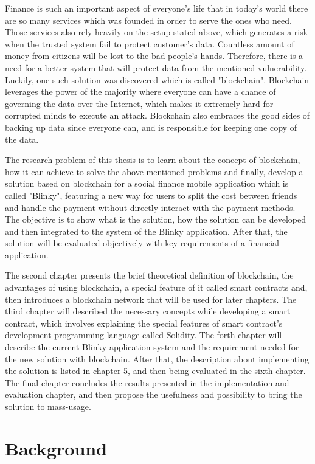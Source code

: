 \documentclass[twoside,draftfooter]{tutthesis} %
\begin{document}
Finance is such an important aspect of everyone's life that in today's world there are so many services which was founded in order to serve the ones who need. Those services also rely heavily on the setup stated above, which generates a risk when the trusted system fail to protect customer's data. Countless amount of money from citizens will be lost to the bad people's hands. Therefore, there is a need for a better system that will protect data from the mentioned vulnerability. Luckily, one such solution was discovered which is called "blockchain". Blockchain leverages the power of the majority where everyone can have a chance of governing the data over the Internet, which makes it extremely hard for corrupted minds to execute an attack. Blockchain also embraces the good sides of backing up data since everyone can, and is responsible for keeping one copy of the data.

The research problem of this thesis is to learn about the concept of blockchain, how it can achieve to solve the above mentioned problems and finally, develop a solution based on blockchain for a social finance mobile application which is called "Blinky", featuring a new way for users to split the cost between friends and handle the payment without directly interact with the payment methods. The objective is to show what is the solution, how the solution can be developed and then integrated to the system of the Blinky application. After that, the solution will be evaluated objectively with key requirements of a financial application.

The second chapter presents the brief theoretical definition of blockchain, the advantages of using blockchain, a special feature of it called smart contracts and, then introduces a blockchain network that will be used for later chapters. The third chapter will described the necessary concepts while developing a smart contract, which involves explaining the special features of smart contract's development programming language called Solidity. The forth chapter will describe the current Blinky application system and the requirement needed for the new solution with blockchain. After that, the description about implementing the solution is listed in chapter 5, and then being evaluated in the sixth chapter. The final chapter concludes the results presented in the implementation and evaluation chapter, and then propose the usefulness and possibility to bring the solution to mass-usage.



\chapter{Background}
\label{ch:background}
\end{document}
